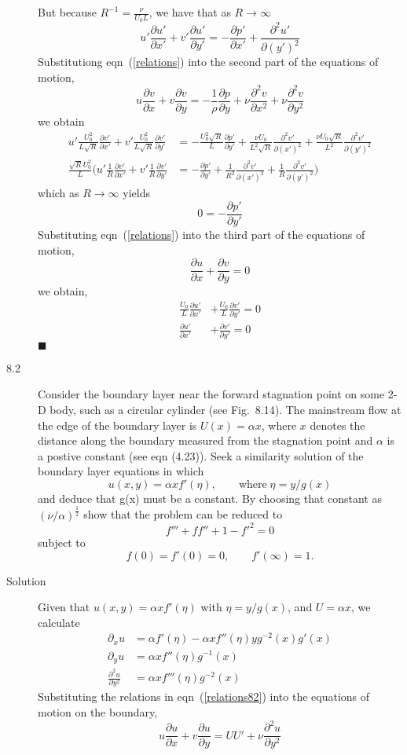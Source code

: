 \documentclass[11pt]{article}
\newcommand{\eq}[1]{\begin{align*}#1\end{align*}}
\newcommand{\eqr}[1]{eqn~(\ref{#1})}
\newcommand{\fp}[2]{\frac{\partial#1}{\partial#2}}
\newcommand{\fpp}[2]{\frac{\partial^2 #1}{\partial#2^2}}
\newcommand{\p}[1]{\partial_{#1}}
\begin{document}
\begin{description}
{}
But because $R^{-1} = \frac{\nu}{U_0 L}$, we have that as $R \rightarrow \infty$
$$
  u' \fp{u'}{x'}
  + v' \fp{u'}{y'}
  =
  - \fp{p'}{x'}
  + \fpp{u'}{(y')}
$$
Substitutiong \eqr{relations} into the second part of the equations of motion,
$$
  u \fp{v}{x} + v \fp{v}{y} = -\frac{1}{\rho} \fp{p}{y} + \nu \fpp{v}{x} + \nu \fpp{v}{y}
$$
we obtain
\eq{
  u' \frac{U_0^2}{L\sqrt{R}} \fp{v'}{x'}
  + v' \frac{U_0^2}{L\sqrt{R}} \fp{v'}{y'}
  &=
  -\frac{U_0^2 \sqrt{R}}{L} \fp{p'}{y'}
  + \frac{\nu U_0}{L^2 \sqrt{R}} \fpp{v'}{(x')}
  + \frac{\nu U_0 \sqrt{R}}{L^2} \fpp{v'}{(y')}
  \\
%
%
  \frac{\sqrt{R}U_0^2}{L}\bigg(
  u' \frac{1}{R} \fp{v'}{x'}
  + v' \frac{1}{R} \fp{v'}{y'}
  &=
  -\fp{p'}{y'}
  + \frac{1}{R^2} \fpp{v'}{(x')}
  + \frac{1}{R} \fpp{v'}{(y')}
  \bigg)
}
which as $R \rightarrow \infty$ yields
$$
  0
  =
  - \fp{p'}{y'}
$$
Substituting \eqr{relations} into the third part of the equations of motion,
$$
  \fp{u}{x} + \fp{v}{y} = 0
$$
we obtain,
\eq{
    \frac{U_0}{L} \fp{u'}{x'} &+ \frac{U_0}{L} \fp{v'}{y'} = 0\\
    \fp{u'}{x'} &+ \fp{v'}{y'} = 0
}
%
\hfill $\blacksquare$
\item[8.2] Consider the boundary layer near the forward stagnation point on some
2-D body, such as a circular cylinder (see Fig.~8.14). The mainstream flow at the
edge of the boundary layer is $U(x) = \alpha x$, where $x$ denotes the distance
along the boundary measured from the stagnation point and $\alpha$ is a postive
constant (see eqn (4.23)). Seek a similarity solution of the boundary layer
equations in which
$$
  u(x, y) = \alpha x f'(\eta),
  \qquad
  \text{where} \; \eta = y / g(x)
$$
and deduce that g(x) must be a constant. By choosing that constant as
$(\nu/\alpha)^{\frac{1}{2}}$ show that the problem can be reduced to
$$
  f''' + ff'' + 1 - f'^2 = 0
$$
subject to
$$
  f(0) = f'(0) = 0,
  \qquad
  f'(\infty) = 1.
$$
\item[Solution]
Given that $u(x,y) = \alpha x f'(\eta)$ with $\eta = y/g(x)$, and $U = \alpha x$,
we calculate
\begin{align}
\label{relations82}
\nonumber  \p{x}u &= \alpha f'(\eta) - \alpha xf''(\eta)y g^{-2}(x)g'(x) \\
\nonumber  \p{y}u &= \alpha x f''(\eta) g^{-1}(x) \\
           \fpp{u}{y} &= \alpha x f'''(\eta) g^{-2}(x)
\end{align}
Substituting the relations in \eqr{relations82} into the equations of motion
on the boundary,
$$
  u \fp{u}{x} + v\fp{u}{y} = UU' + \nu\fpp{u}{y}
$$
\end{description}
\end{document}
